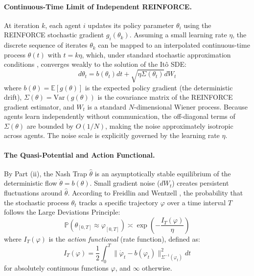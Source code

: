 \paragraph{Continuous-Time Limit of Independent REINFORCE.}
At iteration $k$, each agent $i$ updates its policy parameter $\theta_i$ using the REINFORCE stochastic gradient $g_i(\theta_k)$.
Assuming a small learning rate $\eta$, the discrete sequence of iterates $\theta_k$ can be mapped to an interpolated continuous-time process $\theta(t)$ with $t = k\eta$, which, under standard stochastic approximation conditions \citep{kushner2003stochastic, borkar2009stochastic}, converges weakly to the solution of the It\^o SDE:
\begin{equation}
d\theta_t = b(\theta_t) dt + \sqrt{\eta \Sigma(\theta_t)} dW_t
\label{eq:sde}
\end{equation}
where $b(\theta) = \mathbb{E}[g(\theta)]$ is the expected policy gradient (the deterministic drift), $\Sigma(\theta) = \mathrm{Var}(g(\theta))$ is the covariance matrix of the REINFORCE gradient estimator, and $W_t$ is a standard $N$-dimensional Wiener process.
Because agents learn independently without communication, the off-diagonal terms of $\Sigma(\theta)$ are bounded by $O(1/N)$, making the noise approximately isotropic across agents. The noise scale is explicitly governed by the learning rate $\eta$.

\paragraph{The Quasi-Potential and Action Functional.}
By Part (ii), the Nash Trap $\hat{\theta}$ is an asymptotically stable equilibrium of the deterministic flow $\dot{\theta} = b(\theta)$. Small gradient noise ($dW_t$) creates persistent fluctuations around $\hat{\theta}$.
According to Freidlin and Wentzell \citep{freidlin2012random}, the probability that the stochastic process $\theta_t$ tracks a specific trajectory $\varphi$ over a time interval $T$ follows the Large Deviations Principle:
\begin{equation}
\mathbb{P}(\theta_{[0,T]} \approx \varphi_{[0,T]}) \asymp \exp\left( - \frac{I_T(\varphi)}{\eta} \right)
\end{equation}
where $I_T(\varphi)$ is the \emph{action functional} (rate function), defined as:
\begin{equation}
I_T(\varphi) = \frac{1}{2} \int_0^T \|\dot{\varphi}_t - b(\varphi_t)\|_{\Sigma^{-1}(\varphi_t)}^2 dt
\label{eq:action_functional}
\end{equation}
for absolutely continuous functions $\varphi$, and $\infty$ otherwise.

